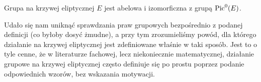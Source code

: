 \begin{corollary}
Grupa na krzywej eliptycznej $E$
jest abelowa i izomorficzna z grupą $\operatorname{Pic}^0(E)$.
\end{corollary}

\noindent
Udało się nam uniknąć sprawdzania praw grupowych
bezpośrednio z podanej definicji (co byłoby dosyć żmudne),
a przy tym zrozumieliśmy powód,
dla którego działanie na krzywej eliptycznej jest zdefiniowane
właśnie w taki sposób.
Jest to o tyle cenne,
że w literaturze fachowej, lecz niekoniecznie matematycznej,
działanie grupowe na krzywej eliptycznej
często definiuje się po prostu poprzez podanie odpowiednich wzorów,
bez wskazania motywacji.
